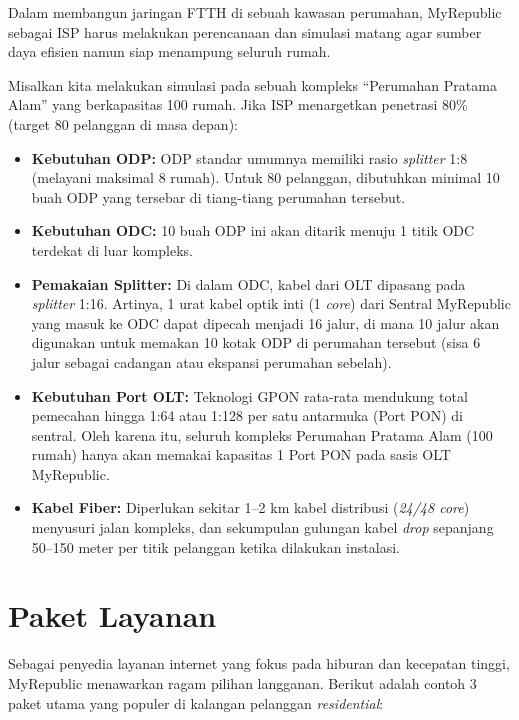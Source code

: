 \documentclass[12pt,a4paper]{article}
\begin{document}
Dalam membangun jaringan FTTH di sebuah kawasan perumahan, MyRepublic sebagai ISP harus melakukan perencanaan dan simulasi matang agar sumber daya efisien namun siap menampung seluruh rumah. 

Misalkan kita melakukan simulasi pada sebuah kompleks ``Perumahan Pratama Alam'' yang berkapasitas 100 rumah. Jika ISP menargetkan penetrasi 80\% (target 80 pelanggan di masa depan):

\begin{itemize}
    \item \textbf{Kebutuhan ODP:} ODP standar umumnya memiliki rasio \textit{splitter} 1:8 (melayani maksimal 8 rumah). Untuk 80 pelanggan, dibutuhkan minimal 10 buah ODP yang tersebar di tiang-tiang perumahan tersebut.
    \item \textbf{Kebutuhan ODC:} 10 buah ODP ini akan ditarik menuju 1 titik ODC terdekat di luar kompleks.
    \item \textbf{Pemakaian Splitter:} Di dalam ODC, kabel dari OLT dipasang pada \textit{splitter} 1:16. Artinya, 1 urat kabel optik inti (1 \textit{core}) dari Sentral MyRepublic yang masuk ke ODC dapat dipecah menjadi 16 jalur, di mana 10 jalur akan digunakan untuk memakan 10 kotak ODP di perumahan tersebut (sisa 6 jalur sebagai cadangan atau ekspansi perumahan sebelah).
    \item \textbf{Kebutuhan Port OLT:} Teknologi GPON rata-rata mendukung total pemecahan hingga 1:64 atau 1:128 per satu antarmuka (Port PON) di sentral. Oleh karena itu, seluruh kompleks Perumahan Pratama Alam (100 rumah) hanya akan memakai kapasitas 1 Port PON pada sasis OLT MyRepublic.
    \item \textbf{Kabel Fiber:} Diperlukan sekitar 1--2 km kabel distribusi (\textit{24/48 core}) menyusuri jalan kompleks, dan sekumpulan gulungan kabel \textit{drop} sepanjang 50--150 meter per titik pelanggan ketika dilakukan instalasi.
\end{itemize}

\section{Paket Layanan}

Sebagai penyedia layanan internet yang fokus pada hiburan dan kecepatan tinggi, MyRepublic menawarkan ragam pilihan langganan. Berikut adalah contoh 3 paket utama yang populer di kalangan pelanggan \textit{residential}:
\end{document}
